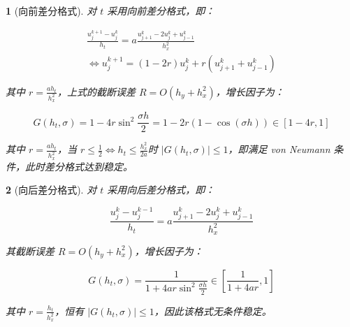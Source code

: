 \documentclass[zihao=5,UTF8]{report}
\theoremstyle{MyTheoremStyle} %
\theoremstyle{MySubsubsectionStyle} %
\newtheorem{definition}{}
\begin{document}
\begin{definition}[向前差分格式]

对 $t$ 采用向前差分格式，即：

\begin{gather}
    \frac{u_j^{k+1}-u_j^k}{h_t}=a\frac{u_{j+1}^k-2u_j^k+u_{j-1}^k}{h_x^2} \\ 
    \Longleftrightarrow    
    u_j^{k+1} = (1-2r)u_j^k + r(u_{j+1}^k+u_{j-1}^k)
\end{gather}

其中 $r = \frac{ah_t }{h_x^2}$，上式的截断误差 $R = O(h_y + h_x^2)$，增长因子为：

\begin{equation}
    G(h_t,\sigma)=1-4r\sin^2\frac{\sigma h}{2} = 1 - 2r(1-\cos(\sigma h)) \in [1 - 4r, 1]
\end{equation}

其中 $r = \frac{ah_t}{h_x^2}$，当 $r \leqslant \frac{1}{2} \Longleftrightarrow h_t \leqslant \frac{h_x^2}{2a}$时 $|G(h_t,\sigma)|\leqslant1$，即满足 von Neumann 条件，此时差分格式达到稳定。

\end{definition}



\begin{definition}[向后差分格式]

对 $t$ 采用向后差分格式，即：

\begin{equation}
    \frac{u_j^{k}-u_j^{k-1}}{h_t}=a\frac{u_{j+1}^k-2u_j^k+u_{j-1}^k}{h_x^2}
\end{equation}

其截断误差 $R = O(h_y + h_x^2)$，增长因子为：

\begin{equation}
    G(h_t,\sigma)=\frac{1}{1+4ar\sin^2\frac{\sigma h}{2}} \in [\frac{1}{1+4ar}, 1]
\end{equation}

其中 $r = \frac{h_t}{h_x^2}$，恒有 $|G(h_t,\sigma)|\leqslant1$，因此该格式无条件稳定。
\end{definition}
\end{document}

